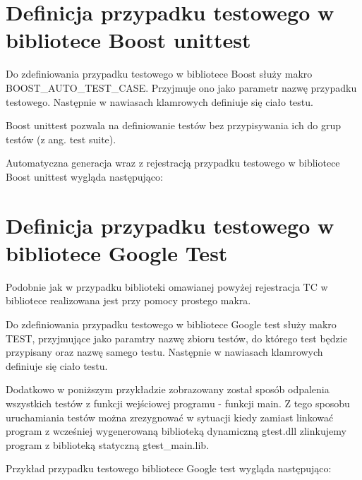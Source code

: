 \documentclass[12pt,a4paper,notitlepage]{report}
\begin{document}
\section{Definicja przypadku testowego w bibliotece Boost unittest}

Do zdefiniowania przypadku testowego w bibliotece Boost służy makro BOOST{\_}AUTO{\_}TEST{\_}CASE. Przyjmuje ono jako parametr nazwę przypadku testowego. Następnie w nawiasach klamrowych definiuje się ciało testu.

Boost unittest pozwala na definiowanie testów bez przypisywania ich do grup testów (z ang. test suite).

Automatyczna generacja wraz z rejestracją przypadku testowego w bibliotece Boost unittest wygląda następująco:

			


\section{Definicja przypadku testowego w bibliotece Google Test}

Podobnie jak w przypadku biblioteki omawianej powyżej rejestracja TC w bibliotece realizowana jest przy pomocy prostego makra. 

Do zdefiniowania przypadku testowego w bibliotece Google test służy makro TEST, przyjmujące jako paramtry nazwę zbioru testów, do którego test będzie przypisany oraz nazwę samego testu. Następnie w nawiasach klamrowych definiuje się ciało testu.

Dodatkowo w poniższym przykładzie zobrazowany został sposób odpalenia wszystkich testów z funkcji wejściowej programu - funkcji main. Z tego sposobu uruchamiania testów można zrezygnować w sytuacji kiedy zamiast linkować program z wcześniej wygenerowaną biblioteką dynamiczną gtest.dll zlinkujemy program z biblioteką statyczną gtest{\_}main.lib.

Przykład przypadku testowego bibliotece Google test wygląda następująco:

			
\end{document}
